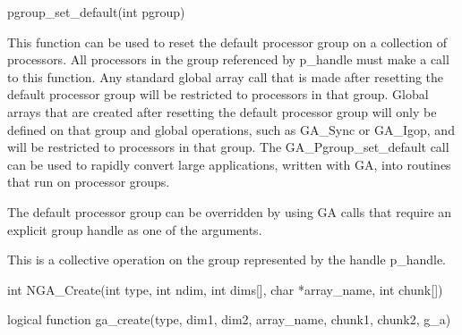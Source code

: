 \documentclass[12pt]{article}
\begin{document}
\begin{pyapi}
\begin{pycode}
pgroup_set_default(int pgroup)
\end{pycode}
\end{pyapi}

\gcoll

\begin{desc}

  This function can be used to reset the default processor group on a
  collection of processors. All processors in the group referenced by
  p_handle must make a call to this function. Any standard global
  array call that is made after resetting the default processor group
  will be restricted to processors in that group. Global arrays that
  are created after resetting the default processor group will only be
  defined on that group and global operations, such as GA_Sync or
  GA_Igop, and will be restricted to processors in that group. The
  GA_Pgroup_set_default call can be used to rapidly convert large
  applications, written with GA, into routines that run on processor
  groups.

  The default processor group can be overridden by using GA calls that
  require an explicit group handle as one of the arguments.

  This is a collective operation on the group represented by the
  handle p_handle.

\end{desc}


\begin{capi}
\begin{ccode}
int NGA_Create(int type, int ndim, int dims[], char *array_name, int chunk[])
\end{ccode}
\begin{funcargs}
\end{funcargs}
\end{capi}

\begin{f2dapi}
\begin{fcode}
logical function ga_create(type, dim1, dim2, array_name, chunk1, chunk2, g_a)
\end{fcode}
\begin{funcargs}
\end{funcargs}
\end{f2dapi}
\end{document}
